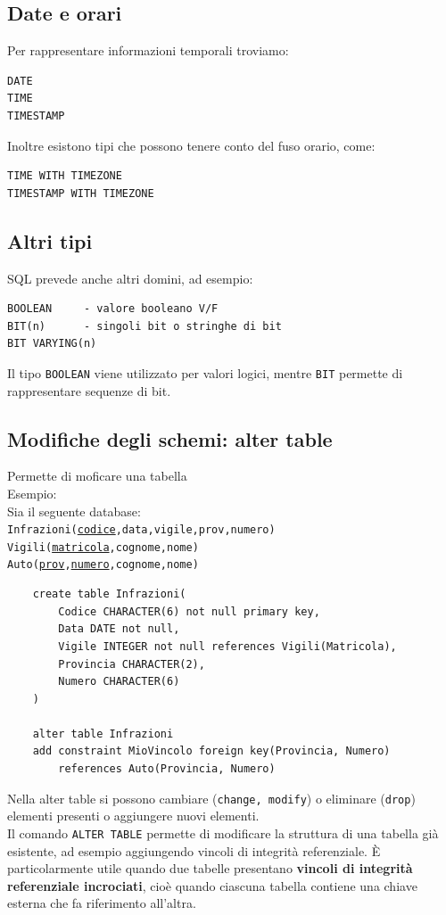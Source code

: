 \subsection{Date e orari}
Per rappresentare informazioni temporali troviamo:
\begin{verbatim}
DATE
TIME
TIMESTAMP
\end{verbatim}
\noindent Inoltre esistono tipi che possono tenere conto del fuso orario,
come:
\begin{verbatim}
TIME WITH TIMEZONE
TIMESTAMP WITH TIMEZONE
\end{verbatim}

\subsection{Altri tipi}
SQL prevede anche altri domini, ad esempio:
\begin{verbatim}
BOOLEAN     - valore booleano V/F
BIT(n)      - singoli bit o stringhe di bit 
BIT VARYING(n)
\end{verbatim}
\noindent Il tipo \texttt{BOOLEAN} viene utilizzato per valori logici, mentre
\texttt{BIT} permette di rappresentare sequenze di bit.

\subsection{Modifiche degli schemi: alter table}
Permette di moficare una tabella\\
\textcolor{verdeEsempio}{Esempio: }\\
Sia il seguente database:\\
\texttt{Infrazioni(\underline{codice},data,vigile,prov,numero)}\\
\texttt{Vigili(\underline{matricola},cognome,nome)}\\
\texttt{Auto(\underline{prov},\underline{numero},cognome,nome)}
\begin{verbatim}
    create table Infrazioni(
        Codice CHARACTER(6) not null primary key,
        Data DATE not null,
        Vigile INTEGER not null references Vigili(Matricola),
        Provincia CHARACTER(2),
        Numero CHARACTER(6)
    )

    alter table Infrazioni
    add constraint MioVincolo foreign key(Provincia, Numero)
        references Auto(Provincia, Numero)
\end{verbatim}
\noindent Nella alter table si possono cambiare (\texttt{change, modify}) o eliminare (\texttt{drop}) elementi presenti o aggiungere nuovi elementi.\\
Il comando \texttt{ALTER TABLE} permette di modificare la struttura di una tabella già esistente, ad esempio aggiungendo vincoli di integrità referenziale.
È particolarmente utile quando due tabelle presentano \textbf{vincoli di integrità referenziale incrociati}, cioè quando ciascuna tabella contiene una chiave esterna che fa riferimento all'altra.
